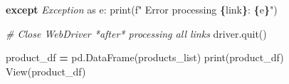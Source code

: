 \documentclass[
]{article}
\newenvironment{Shaded}{\begin{snugshade}}{\end{snugshade}}
\newcommand{\BuiltInTok}[1]{#1}
\newcommand{\CommentTok}[1]{\textcolor[rgb]{0.56,0.35,0.01}{\textit{#1}}}
\newcommand{\ControlFlowTok}[1]{\textcolor[rgb]{0.13,0.29,0.53}{\textbf{#1}}}
\newcommand{\ImportTok}[1]{#1}
\newcommand{\NormalTok}[1]{#1}
\newcommand{\OperatorTok}[1]{\textcolor[rgb]{0.81,0.36,0.00}{\textbf{#1}}}
\newcommand{\PreprocessorTok}[1]{\textcolor[rgb]{0.56,0.35,0.01}{\textit{#1}}}
\newcommand{\SpecialCharTok}[1]{\textcolor[rgb]{0.81,0.36,0.00}{\textbf{#1}}}
\newcommand{\SpecialStringTok}[1]{\textcolor[rgb]{0.31,0.60,0.02}{#1}}
\begin{document}
\begin{Shaded}
\begin{Highlighting}[]
    \ControlFlowTok{except} \PreprocessorTok{Exception} \ImportTok{as}\NormalTok{ e:}
        \BuiltInTok{print}\NormalTok{(}\SpecialStringTok{f" Error processing }\SpecialCharTok{\{}\NormalTok{link}\SpecialCharTok{\}}\SpecialStringTok{: }\SpecialCharTok{\{}\NormalTok{e}\SpecialCharTok{\}}\SpecialStringTok{"}\NormalTok{)}

\CommentTok{\# Close WebDriver *after* processing all links}
\NormalTok{driver.quit()}

\NormalTok{product\_df }\OperatorTok{=}\NormalTok{ pd.DataFrame(products\_list)}
\BuiltInTok{print}\NormalTok{(product\_df)}
\NormalTok{View(product\_df)}
\end{Highlighting}
\end{Shaded}
\end{document}
